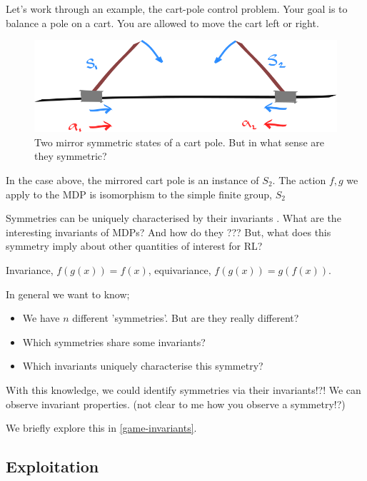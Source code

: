 Let's work through an example, the cart-pole control problem. Your goal is to balance a pole on a cart.
You are allowed to move the cart left or right.


\begin{figure}[h!]
	\centering
	\includegraphics[width=1\textwidth,height=0.25\textheight]{../../pictures/drawings/cart-pole-mirror.png}
	\caption{Two mirror symmetric states of a cart pole. But in what sense are they symmetric?}
\end{figure}

In the case above, the mirrored cart pole is an instance of $S_2$.
The action $f, g$ we apply to the MDP is isomorphism to the simple finite group, $S_2$

Symmetries can be uniquely characterised by their invariants \cite{PeterOlver1999}.
What are the interesting invariants of MDPs? And how do they ???
But, what does this symmetry imply about other quantities of interest for RL?

Invariance, $f(g(x)) = f(x)$, equivariance, $f(g(x)) = g(f(x))$.

In general we want to know;

\begin{itemize}
	\tightlist
	\item We have $n$ different 'symmetries'. But are they really different?
	\item Which symmetries share some invariants?
	\item Which invariants uniquely characterise this symmetry?
\end{itemize}

With this knowledge, we could identify symmetries via their invariants!?!
We can observe invariant properties. (not clear to me how you observe a symmetry!?)

We briefly explore this in \ref{game-invariants}.

\subsection{Exploitation} \label{symmetric-exploitation}


